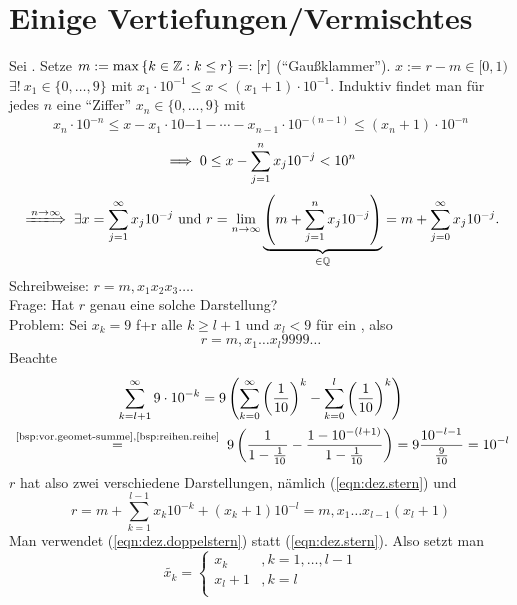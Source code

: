 \documentclass[12pt]{scrreprt}
\begin{document}
\section{Einige Vertiefungen/Vermischtes}
\label{sec:reihen.vermischtes}

\begin{bsp}[Dezimaldarstellung]
  \label{bsp:reihen.dez}
  Sei . Setze $m:=\max{\{k\in\ensuremath{\mathbb{Z}}:k\le r\}} =: [r]$
  ("`Gaußklammer"'). \folgt $x:=r-m \in [0,1)$ \folgt $\exists!\ x_1
  \in \{0,\dotsc,9\}$ mit $x_1\cdot10^{-1} \le x <
  (x_1+1)\cdot10^{-1}$.
  Induktiv findet man für jedes $n$ eine "`Ziffer"'
  $x_n\in\{0,\dotsc,9\}$ mit \[x_n\cdot10^{-n} \le
  x-x_1\cdot10{-1}-\dotsb-x_{n-1}\cdot10^{-(n-1)} \le
  (x_n+1)\cdot10^{-n}\]
  \[\implies 0 \le x - \sum_{j=1}^{n}{x_j10^{-j}}<10^n\]
  \[\folgtwegen{\ninf} \exists x=\sum_{j=1}^{\infty}x_j10^{-j} \text{
    und } r =
  \lim_{\ninf}{\underbrace{\left(m+\sum_{j=1}^n{x_j10^{-j}}\right)}_{\in\set{Q}}}=m+\sum_{j=0}^{\infty}{x_j10^{-j}}.\]
    Schreibweise: $r=m{,}x_1x_2x_3\dotsc$.\\
  Frage: Hat $r$ genau eine solche Darstellung?\\
  Problem: Sei $x_k=9$ f+r alle $k\ge l+1$ und $x_l<9$ für ein
  , also
  \begin{equation}
    \label{eqn:dez.stern}
    r=m{,}x_1\dotsc x_l9999\dotsc \tag{$*$}
  \end{equation}
  Beachte \begin{multline*}
    \sum_{k=l+1}^{\infty}{9\cdot10^{-k}} =
    9\left(\sum_{k=0}^{\infty}\left(\frac{1}{10}\right)^k-\sum_{k=0}^l\left(\frac{1}{10}\right)^k\right)
    \\\nach{=}{\ref{bsp:vor.geomet-summe},\ref{bsp:reihen.reihe}}
    9\left(\frac{1}{1-\frac{1}{10}}-\frac{1-10^{-(l+1)}}{1-\frac{1}{10}}\right)
    = 9\frac{10^{-l-1}}{\frac{9}{10}}=10^{-l}
  \end{multline*}
  $r$ hat also zwei verschiedene Darstellungen, nämlich
  (\ref{eqn:dez.stern}) und
  \begin{equation}
    \label{eqn:dez.doppelstern}
    r=m+\sum_{k=1}^{l-1}{x_k10^{-k}}+(x_k+1)10^{-l}=m{,}x_1\dotsc
    x_{l-1}(x_l+1) \tag{$**$}
  \end{equation}
  Man verwendet (\ref{eqn:dez.doppelstern}) statt
  (\ref{eqn:dez.stern}). Also setzt man
  \[\tilde{x_k}=
  \begin{cases}
    x_k   &, k=1,\dotsc,l-1 \\
    x_l+1 &, k=l \\

\end{cases}\]
\end{bsp}
\end{document}

